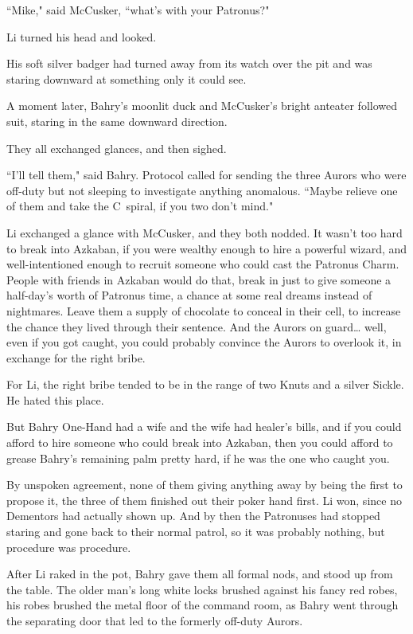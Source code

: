``Mike," said McCusker, ``what's with your Patronus?"

Li turned his head and looked.

His soft silver badger had turned away from its watch over the pit and was staring downward at something only it could see.

A moment later, Bahry's moonlit duck and McCusker's bright anteater followed suit, staring in the same downward direction.

They all exchanged glances, and then sighed.

``I'll tell them," said Bahry. Protocol called for sending the three Aurors who were off-duty but not sleeping to investigate anything anomalous. ``Maybe relieve one of them and take the C~spiral, if you two don't mind."

Li exchanged a glance with McCusker, and they both nodded. It wasn't too hard to break into Azkaban, if you were wealthy enough to hire a powerful wizard, and well-intentioned enough to recruit someone who could cast the Patronus Charm. People with friends in Azkaban would do that, break in just to give someone a half-day's worth of Patronus time, a chance at some real dreams instead of nightmares. Leave them a supply of chocolate to conceal in their cell, to increase the chance they lived through their sentence. And the Aurors on guard{\ldots} well, even if you got caught, you could probably convince the Aurors to overlook it, in exchange for the right bribe.

For Li, the right bribe tended to be in the range of two Knuts and a silver Sickle. He hated this place.

But Bahry One-Hand had a wife and the wife had healer's bills, and if you could afford to hire someone who could break into Azkaban, then you could afford to grease Bahry's remaining palm pretty hard, if he was the one who caught you.

By unspoken agreement, none of them giving anything away by being the first to propose it, the three of them finished out their poker hand first. Li won, since no Dementors had actually shown up. And by then the Patronuses had stopped staring and gone back to their normal patrol, so it was probably nothing, but procedure was procedure.

After Li raked in the pot, Bahry gave them all formal nods, and stood up from the table. The older man's long white locks brushed against his fancy red robes, his robes brushed the metal floor of the command room, as Bahry went through the separating door that led to the formerly off-duty Aurors.

